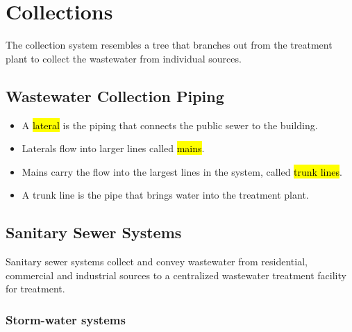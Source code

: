 



\chapter{Collections}






The collection system resembles a tree that branches out from the treatment plant to collect the wastewater from individual sources.

\section{Wastewater Collection Piping}	
	\begin{itemize}
		\item A \hl{lateral} is the piping that connects the public sewer to the building. 
		\item Laterals flow into larger lines called \hl{mains}.
		\item Mains carry the flow into the largest lines in the system, called \hl{trunk lines}. 
		\item A trunk line is the pipe that brings water into the treatment plant.
	\end{itemize}
\section{Sanitary Sewer Systems}

Sanitary sewer systems collect and convey wastewater from residential, commercial and industrial sources to a centralized wastewater treatment facility for treatment. 

\subsection{Storm-water systems}

